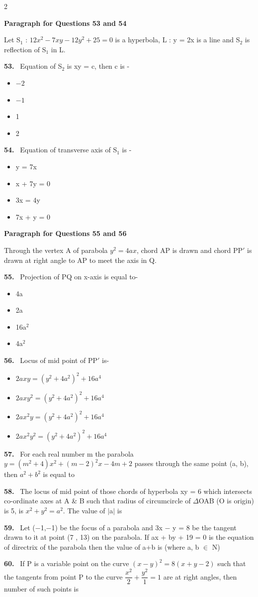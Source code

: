 \documentclass[10pt]{extarticle}
\newcommand{\qn}[1]{\par\smallskip\noindent\textbf{#1.}~}
\newcommand{\paraq}[2]{\par\smallskip\noindent\textbf{Paragraph for Questions #1 and #2}\par}
\newenvironment{qoptions}{\begin{itemize}[leftmargin=1.8em,itemsep=1pt,topsep=2pt,label={}]}{\end{itemize}}
\newcommand{\opt}[2]{\item[(#1)] #2}
\begin{document}
\begin{multicols}{2}
\begin{qoptions}
\end{qoptions}
\paraq{53}{54}Let S$_1$ : $12x^2-7xy-12y^2+25=0$ is a hyperbola, L : y = 2x is a line and S$_2$ is reflection of S$_1$ in L.
\qn{53} Equation of S$_2$ is xy = c, then c is -
\begin{qoptions}
\opt{A}{$-2$}
\opt{B}{$-1$}
\opt{C}{1}
\opt{D}{2}
\end{qoptions}
\qn{54} Equation of transverse axis of S$_1$ is -
\begin{qoptions}
\opt{A}{y = 7x}
\opt{B}{x + 7y = 0}
\opt{C}{3x = 4y}
\opt{D}{7x + y = 0}
\end{qoptions}
\paraq{55}{56}Through the vertex A of parabola $y^2=4ax$, chord AP is drawn and chord PP$'$ is drawn at right angle to AP to meet the axis in Q.
\qn{55} Projection of PQ on x-axis is equal to-
\begin{qoptions}
\opt{A}{4a}
\opt{B}{2a}
\opt{C}{16a$^2$}
\opt{D}{4a$^2$}
\end{qoptions}
\qn{56} Locus of mid point of PP$'$ is-
\begin{qoptions}
\opt{A}{$2axy=(y^2+4a^2)^2+16a^4$}
\opt{B}{$2axy^2=(y^2+4a^2)^2+16a^4$}
\opt{C}{$2ax^2y=(y^2+4a^2)^2+16a^4$}
\opt{D}{$2ax^2y^2=(y^2+4a^2)^2+16a^4$}
\end{qoptions}
\qn{57} For each real number m the parabola $y=(m^2+4)x^2+(m-2)^2x-4m+2$ passes through the same point (a, b), then $a^2+b^2$ is equal to
\qn{58} The locus of mid point of those chords of hyperbola xy = 6 which intersects co-ordinate axes at A \& B such that radius of circumcircle of $\Delta$OAB (O is origin) is 5, is $x^2+y^2=a^2$. The value of $|$a$|$ is
\qn{59} Let ($-$1,$-$1) be the focus of a parabola and 3x $-$ y = 8 be the tangent drawn to it at point (7 , 13) on the parabola. If ax + by + 19 = 0 is the equation of directrix of the parabola then the value of a+b is (where a, b $\in$ N)
\qn{60} If P is a variable point on the curve $(x-y)^2=8(x+y-2)$ such that the tangents from point P to the curve $\dfrac{x^2}2+\dfrac{y^2}1=1$ are at right angles, then number of such points is
\end{multicols}
\end{document}
